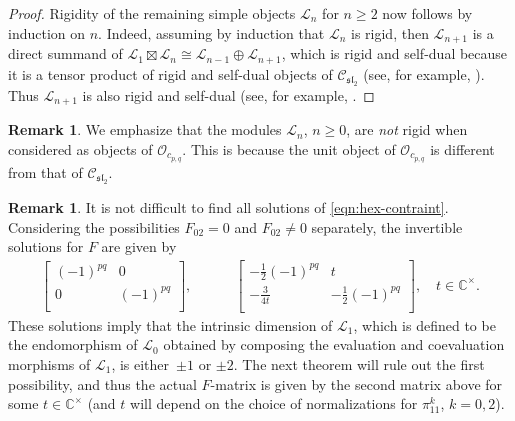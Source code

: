 \documentclass[pdftex]{sigma}
\numberwithin{equation}{section}
\theoremstyle{definition}
\newtheorem{Remark}[Theorem]{Remark}
\begin{document}
\begin{proof}
Rigidity of the remaining simple objects $\mathcal{L}_n$ for $n\geq 2$ now follows by induction on $n$. Indeed, assuming by induction that $\mathcal{L}_n$ is rigid, then $\mathcal{L}_{n+1}$ is a direct summand of
$
\mathcal{L}_{1}\boxtimes\mathcal{L}_n\cong\mathcal{L}_{n-1}\oplus\mathcal{L}_{n+1}$,
which is rigid and self-dual because it is a tensor product of rigid and self-dual objects of $\mathcal{C}_{\mathfrak{sl}_2}$
(see, for example, \cite[Lemma~A.3]{KL4}).
Thus $\mathcal{L}_{n+1}$ is also rigid and self-dual (see, for example, \cite[Lemma~5.9]{MS-cpq-Vir}.
\end{proof}

\begin{Remark}
We emphasize that the modules $\mathcal{L}_n$, $n\geq 0$, are \textit{not} rigid when considered as objects of $\mathcal{O}_{c_{p,q}}$. This is because the unit object of $\mathcal{O}_{c_{p,q}}$ is different from that of $\mathcal{C}_{\mathfrak{sl}_2}$.
\end{Remark}

\begin{Remark}
It is not difficult to find all solutions of \eqref{eqn:hex-contraint}. Considering the possibilities $F_{02}=0$ and $F_{02}\neq 0$ separately, the invertible solutions for $F$ are given by
\begin{gather*}
\left[\begin{matrix}
(-1)^{pq} & 0\\
0 & (-1)^{pq}\\
\end{matrix}\right],\qquad\quad\left[\begin{matrix}
-\frac{1}{2}(-1)^{pq} & t\\
-\frac{3}{4t} & -\frac{1}{2}(-1)^{pq}\\
\end{matrix}\right],\quad t\in\mathbb{C}^\times.
\end{gather*}
These solutions imply that the intrinsic dimension of $\mathcal{L}_1$, which is defined to be the endomorphism of $\mathcal{L}_0$ obtained by composing the evaluation and coevaluation morphisms of $\mathcal{L}_1$, is either~$\pm 1$ or $\pm 2$. The next theorem will rule out the first possibility, and thus the actual $F$-matrix is given by the second matrix above for some $t\in\mathbb{C}^\times$ (and $t$ will depend on the choice of normalizations for $\pi_{11}^k$, $k=0,2$).
\end{Remark}
\end{document}
